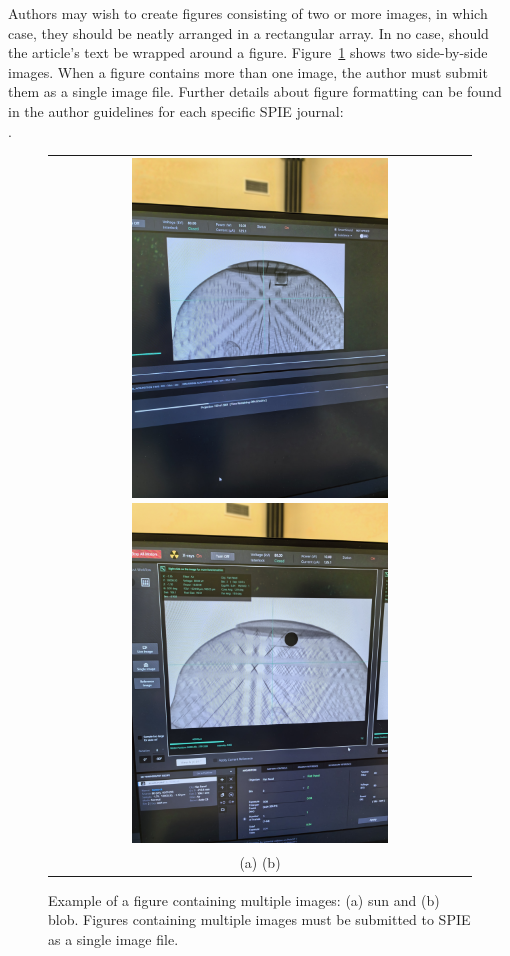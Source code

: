 \documentclass[12pt]{spieman}  %
\begin{document}
\begin{spacing}{2}
Authors may wish to create figures consisting of two or more images, in which case, they should be neatly arranged in a rectangular array.  In no case, should the article's text be wrapped around a figure. Figure~\ref{fig:example2} shows two side-by-side images. When a figure contains more than one image, the author must submit them as a single image file. Further details about figure formatting can be found in the author guidelines for each specific SPIE journal: \\
. 

\begin{figure}
\begin{center}
\begin{tabular}{c}
\includegraphics[height=9.0cm]{Pictures/Prescan PLA.jpg}
\hspace{1.0cm}
\includegraphics[height=9.0cm]{Pictures/Prescan Stainless Steel.jpg}  
\\
(a) \hspace{7.5cm} (b)
\end{tabular}
\end{center}
\caption 
{ \label{fig:example2}
Example of a figure containing multiple images: (a) sun and (b) blob. Figures containing multiple images must be submitted to SPIE as a single image file.} 
\end{figure} 


\end{spacing}
\end{document}
